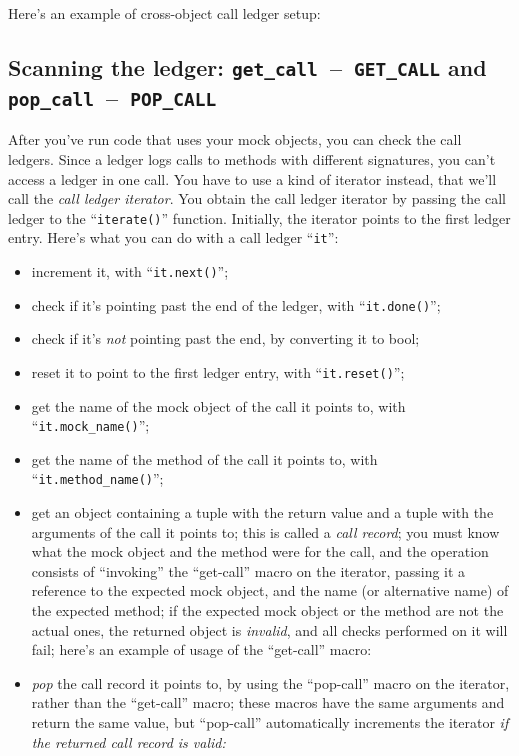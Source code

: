\documentclass[twoside, a4paper, article]{memoir}
\newcommand*\testudocolor{\color{red!80!blue}}
\newcommand*\testudo[1]{\texttt{\testudocolor{}#1}}
\newcommand*\testudopair[2]{\testudo{#1}~--~\testudo{#2}}
\providecommand\typesetexample[1]{%
}
\begin{document}
Here's an example of cross-object call ledger setup:

\typesetexample{ledger-setup}

\subsection[Scanning the ledger]%
  {Scanning the ledger:
    \testudopair{get\_call}{GET\_CALL} and
    \testudopair{pop\_call}{POP\_CALL}}
\label{sec:scan-ledger}

After you've run code that uses your mock objects, you can check the call
ledgers.  Since a ledger logs calls to methods with different signatures, you
can't access a ledger in one call.  You have to use a kind of iterator instead,
that we'll call the \emph{call ledger iterator}.  You obtain the call ledger
iterator by passing the call ledger to the ``\texttt{iterate()}'' function.
Initially, the iterator points to the first ledger entry.  Here's what you can
do with a call ledger ``\texttt{it}'':
\begin{itemize}
\item increment it, with ``\texttt{it.next()}'';
\item check if it's pointing past the end of the ledger, with
  ``\texttt{it.done()}'';
\item check if it's \emph{not} pointing past the end, by converting it to bool;
\item reset it to point to the first ledger entry, with
  ``\texttt{it.reset()}'';
\item get the name of the mock object of the call it points to, with
  ``\texttt{it.mock\_name()}'';
\item get the name of the method of the call it points to, with
  ``\texttt{it.method\_name()}'';
\item get an object containing a tuple with the return value and a tuple with
  the arguments of the call it points to; this is called a \emph{call record};
  you must know what the mock object and the method were for the call, and the
  operation consists of ``invoking'' the ``get-call'' macro on the iterator,
  passing it a reference to the expected mock object, and the name (or
  alternative name) of the expected method; if the expected mock object or the
  method are not the actual ones, the returned object is \emph{invalid}, and
  all checks performed on it will fail; here's an example of usage of the
  ``get-call'' macro:

  \typesetexample{ledger-iterator-get-call}

\item \emph{pop} the call record it points to, by using the ``pop-call'' macro
  on the iterator, rather than the ``get-call'' macro; these macros have the
  same arguments and return the same value, but ``pop-call'' automatically
  increments the iterator \emph{if the returned call record is valid:}

  \typesetexample{ledger-iterator-pop-call}
\end{itemize}
\end{document}
